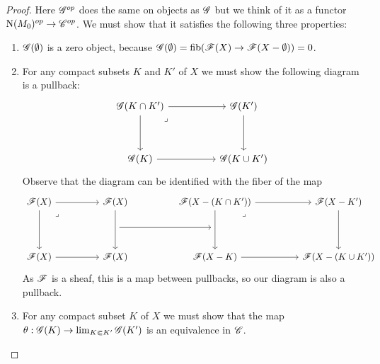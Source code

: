 \documentclass[../../thesis.tex]{subfiles}
\begin{document}
\begin{proof}
    Here $\mathscr{G}^{op}$ does the same on objects as $\mathscr{G}$ but we think of it as a functor $\mathrm{N}(M_0)^{op}\to \mathscr{C}^{op}$.
    We must show that it satisfies the following three properties:
    \begin{enumerate}
        \item $\mathscr{G}(\emptyset)$ is a zero object, because $\mathscr{G}(\emptyset)=\operatorname{fib}(\mathscr{F}(X)\to \mathscr{F}(X-\emptyset))=0$.
        \item For any compact subsets $K$ and $K'$ of $X$ we must show the following diagram is a pullback:
              \[\begin{tikzcd}
                      {\G(K\cap K')} && {\G(K')} \\
                      \\
                      {\G(K)} && {\G(K\cup K')}
                      \arrow[from=1-1, to=3-1]
                      \arrow[from=3-1, to=3-3]
                      \arrow[from=1-1, to=1-3]
                      \arrow[from=1-3, to=3-3]
                      \arrow["\lrcorner"{anchor=center, pos=0.125}, draw=none, from=1-1, to=3-3]
                  \end{tikzcd}\]
              Observe that the diagram can be identified with the fiber of the map
              \[\begin{tikzcd}
                      {\F(X)} && {\F(X)} && {\F(X-(K\cap K'))} && {\F(X-K')} \\
                      && {} && {} \\
                      {\F(X)} && {\F(X)} && {\F(X-K)} && {\F(X-(K\cup K'))}
                      \arrow[from=1-5, to=3-5]
                      \arrow[from=3-5, to=3-7]
                      \arrow[from=1-5, to=1-7]
                      \arrow[from=1-7, to=3-7]
                      \arrow["\lrcorner"{anchor=center, pos=0.125}, draw=none, from=1-5, to=3-7]
                      \arrow[from=2-3, to=2-5]
                      \arrow[from=1-3, to=3-3]
                      \arrow[from=1-1, to=1-3]
                      \arrow[from=1-1, to=3-1]
                      \arrow[from=3-1, to=3-3]
                      \arrow["\lrcorner"{anchor=center, pos=0.125}, draw=none, from=1-1, to=3-3]
                  \end{tikzcd}\]
              As $\mathscr{F}$ is a sheaf, this is a map between pullbacks, so our diagram is also a pullback.
        \item For any compact subset $K$ of $X$ we must show that the map $\theta: \mathscr{G}(K)\to \lim_{K\Subset K'}\mathscr{G}(K')$ is an equivalence in $\mathscr{C}$.

\end{enumerate}
\end{proof}
\end{document}
